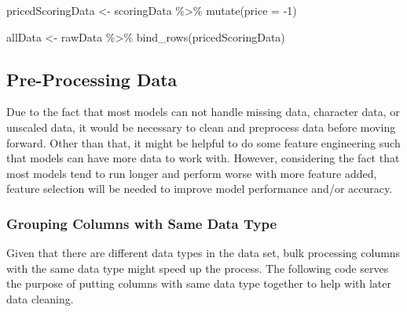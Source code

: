 \documentclass[
]{article}
\newenvironment{Shaded}{\begin{snugshade}}{\end{snugshade}}
\newcommand{\AttributeTok}[1]{\textcolor[rgb]{0.77,0.63,0.00}{#1}}
\newcommand{\DecValTok}[1]{\textcolor[rgb]{0.00,0.00,0.81}{#1}}
\newcommand{\FunctionTok}[1]{\textcolor[rgb]{0.00,0.00,0.00}{#1}}
\newcommand{\NormalTok}[1]{#1}
\newcommand{\OtherTok}[1]{\textcolor[rgb]{0.56,0.35,0.01}{#1}}
\newcommand{\SpecialCharTok}[1]{\textcolor[rgb]{0.00,0.00,0.00}{#1}}
\begin{document}
\begin{Shaded}
\begin{Highlighting}[]
\NormalTok{pricedScoringData }\OtherTok{\textless{}{-}}\NormalTok{ scoringData }\SpecialCharTok{\%\textgreater{}\%} \FunctionTok{mutate}\NormalTok{(}\AttributeTok{price =} \SpecialCharTok{{-}}\DecValTok{1}\NormalTok{)}

\NormalTok{allData }\OtherTok{\textless{}{-}}\NormalTok{ rawData }\SpecialCharTok{\%\textgreater{}\%} \FunctionTok{bind\_rows}\NormalTok{(pricedScoringData) }
\end{Highlighting}
\end{Shaded}

\hypertarget{pre-processing-data}{%
\subsection{Pre-Processing Data}\label{pre-processing-data}}

Due to the fact that most models can not handle missing data, character
data, or unscaled data, it would be necessary to clean and preprocess
data before moving forward. Other than that, it might be helpful to do
some feature engineering such that models can have more data to work
with. However, considering the fact that most models tend to run longer
and perform worse with more feature added, feature selection will be
needed to improve model performance and/or accuracy.

\hypertarget{grouping-columns-with-same-data-type}{%
\subsubsection{Grouping Columns with Same Data
Type}\label{grouping-columns-with-same-data-type}}

Given that there are different data types in the data set, bulk
processing columns with the same data type might speed up the process.
The following code serves the purpose of putting columns with same data
type together to help with later data cleaning.
\end{document}
